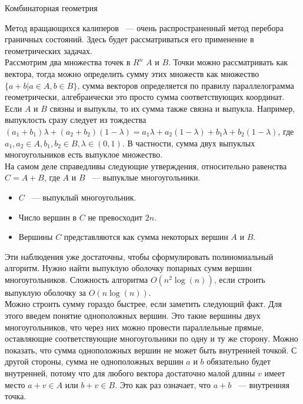  Комбинаторная геометрия

Метод вращающихся калиперов ~--- очень распространенный метод перебора
граничных состояний. Здесь будет рассматриваться его применение
в геометрических задачах.\\

Рассмотрим два множества точек в $R^n$ $A$ и $B$. Точки можно рассматривать
как вектора, тогда можно определить сумму этих
множеств как множество $\{ a + b | a \in A, b \in B\}$, сумма векторов
определяется по правилу параллелограмма геометрически,
алгебраически это просто сумма соответствующих координат.
Если $A$ и $B$ связны и выпуклы,
то их сумма также связна и выпукла. Например, выпуклость сразу
следует из тождества $(a_1 + b_1) \lambda + (a_2 + b_2) (1 - \lambda) =
a_1 \lambda + a_2 (1 - \lambda) + b_1 \lambda + b_2 (1 - \lambda)$,
где $a_1, a_2 \in A, b_1, b_2 \in B, \lambda \in (0, 1)$.
В частности, сумма двух выпуклых многоугольников есть
выпуклое множество.\\

На самом деле справедливы следующие утверждения, относительно
равенства $C = A + B$, где $A$ и $B$ ~--- выпуклые многоугольники.\\
\begin{itemize}
\item $C$ ~--- выпуклый многоугольник.
\item Число вершин в $C$ не превосходит $2n$.
\item Вершины $C$ представляются как сумма некоторых вершин $A$ и $B$.
\end{itemize}

Эти наблюдения уже достаточны, чтобы сформулировать полиномиальный
алгоритм. Нужно найти выпуклую оболочку попарных сумм вершин многоугольников.
Сложность алгоритма $O(n^2\log(n))$, если строить выпуклую оболочку за
$O(n\log(n))$.\\

Можно строить сумму гораздо быстрее, если заметить следующий факт. Для этого
введем понятие одноположных вершин. Это такие вершины двух многоугольников,
что через них можно провести параллельные прямые, оставляющие
соответствующие многоугольники по одну и ту же сторону. Можно показать,
что сумма одноположных вершин не может быть внутренней точкой. С другой
стороны, сумма не одноположных вершин $a$ и $b$ обязательно будет внутренней,
потому что для любого вектора достаточно малой длины $v$ имеет место
$a + v \in A$ или $b + v \in B$.
Это как раз означает, что $a + b$ ~--- внутренняя точка.\\

